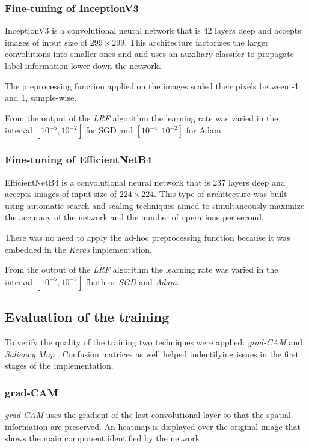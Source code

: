 \subsubsection{Fine-tuning of InceptionV3}\label{sec:inceptionv3}
InceptionV3 is a convolutional neural network that is 42 layers deep and accepts images of input size of $299 \times 299$. This architecture factorizes the larger convolutions  into smaller ones and and uses an auxiliary classifer to propagate label information lower down the network.
 \par
The preprocessing function applied on the images scaled their pixels between -1 and 1, sample-wise. \par
From the output of the \textit{LRF} algorithm the learning rate was varied in the interval $[10^{-5}, 10^{-2}]$ for SGD and $[10^{-4}, 10^{-2}]$ for Adam.


\subsubsection{Fine-tuning of EfficientNetB4}\label{sec:efficientnetb4}
EfficientNetB4 is a convolutional neural network that is 237 layers deep and accepts images of input size of $224 \times 224$. 
This type of architecture was built using automatic search and scaling techniques
aimed to simultaneously maximize the accuracy of the network and the number of operations per second. \par
There was no need to apply the ad-hoc preprocessing function because it was embedded in the \textit{Keras} implementation. \par
From the output of the \textit{LRF} algorithm the learning rate was varied in the interval $[10^{-5}, 10^{-3}]$ fboth or \textit{SGD} and \textit{Adam}.


\subsection{Evaluation of the training}
To verify the quality of the training two techniques were applied: \textit{grad-CAM} \cite{Selvaraju_2019}  and \textit{Saliency Map} \cite{simonyan2013deep}. Confusion matrices \cite{Stehman1997} as well helped indentifying
issues in the first stages of the implementation.

\subsubsection{grad-CAM}
\textit{grad-CAM} uses the gradient of the last convolutional layer so that the spatial information are preserved. An heatmap is displayed over the original image
that shows the main component identified by the network.


